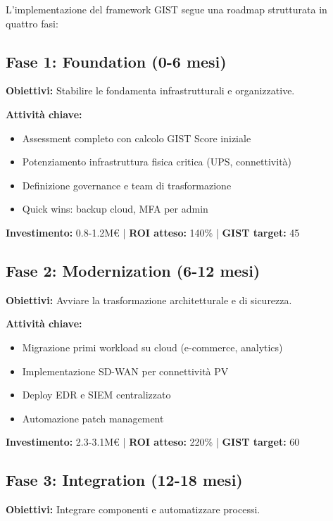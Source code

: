 L'implementazione del framework GIST segue una roadmap strutturata in quattro fasi:

\subsection{Fase 1: Foundation (0-6 mesi)}
\label{subsec:fase1}

\textbf{Obiettivi:} Stabilire le fondamenta infrastrutturali e organizzative.

\textbf{Attività chiave:}
\begin{itemize}
\item Assessment completo con calcolo GIST Score iniziale
\item Potenziamento infrastruttura fisica critica (UPS, connettività)
\item Definizione governance e team di trasformazione
\item Quick wins: backup cloud, MFA per admin
\end{itemize}

\textbf{Investimento:} 0.8-1.2M€ | \textbf{ROI atteso:} 140\% | \textbf{GIST target:} 45

\subsection{Fase 2: Modernization (6-12 mesi)}
\label{subsec:fase2}

\textbf{Obiettivi:} Avviare la trasformazione architetturale e di sicurezza.

\textbf{Attività chiave:}
\begin{itemize}
\item Migrazione primi workload su cloud (e-commerce, analytics)
\item Implementazione SD-WAN per connettività PV
\item Deploy EDR e SIEM centralizzato
\item Automazione patch management
\end{itemize}

\textbf{Investimento:} 2.3-3.1M€ | \textbf{ROI atteso:} 220\% | \textbf{GIST target:} 60

\subsection{Fase 3: Integration (12-18 mesi)}
\label{subsec:fase3}

\textbf{Obiettivi:} Integrare componenti e automatizzare processi.

